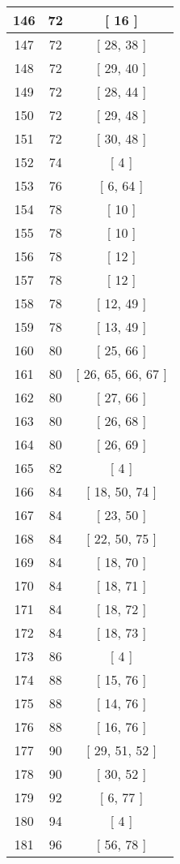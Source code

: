 \begin{center}
\begin{longtable}[H]{|| c c c ||}
\hline
146 & 72 & [ 16 ] \\ 
\hline
147 & 72 & [ 28, 38 ] \\ 
\hline
148 & 72 & [ 29, 40 ] \\ 
\hline
149 & 72 & [ 28, 44 ] \\ 
\hline
150 & 72 & [ 29, 48 ] \\ 
\hline
151 & 72 & [ 30, 48 ] \\ 
\hline
152 & 74 & [ 4 ] \\ 
\hline
153 & 76 & [ 6, 64 ] \\ 
\hline
154 & 78 & [ 10 ] \\ 
\hline
155 & 78 & [ 10 ] \\ 
\hline
156 & 78 & [ 12 ] \\ 
\hline
157 & 78 & [ 12 ] \\ 
\hline
158 & 78 & [ 12, 49 ] \\ 
\hline
159 & 78 & [ 13, 49 ] \\ 
\hline
160 & 80 & [ 25, 66 ] \\ 
\hline
161 & 80 & [ 26, 65, 66, 67 ] \\ 
\hline
162 & 80 & [ 27, 66 ] \\ 
\hline
163 & 80 & [ 26, 68 ] \\ 
\hline
164 & 80 & [ 26, 69 ] \\ 
\hline
165 & 82 & [ 4 ] \\ 
\hline
166 & 84 & [ 18, 50, 74 ] \\ 
\hline
167 & 84 & [ 23, 50 ] \\ 
\hline
168 & 84 & [ 22, 50, 75 ] \\ 
\hline
169 & 84 & [ 18, 70 ] \\ 
\hline
170 & 84 & [ 18, 71 ] \\ 
\hline
171 & 84 & [ 18, 72 ] \\ 
\hline
172 & 84 & [ 18, 73 ] \\ 
\hline
173 & 86 & [ 4 ] \\ 
\hline
174 & 88 & [ 15, 76 ] \\ 
\hline
175 & 88 & [ 14, 76 ] \\ 
\hline
176 & 88 & [ 16, 76 ] \\ 
\hline
177 & 90 & [ 29, 51, 52 ] \\ 
\hline
178 & 90 & [ 30, 52 ] \\ 
\hline
179 & 92 & [ 6, 77 ] \\ 
\hline
180 & 94 & [ 4 ] \\ 
\hline
181 & 96 & [ 56, 78 ] \\ 

\end{longtable}
\end{center}
